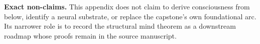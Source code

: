 \begin{reviewbox}
\textbf{Exact non-claims.} This appendix does not claim to derive consciousness from below, identify a neural substrate, or replace the capstone's own foundational arc. Its narrower role is to record the structural mind theorem as a downstream roadmap whose proofs remain in the source manuscript.\cite{MaleyMindRigidInterface}
\end{reviewbox}
